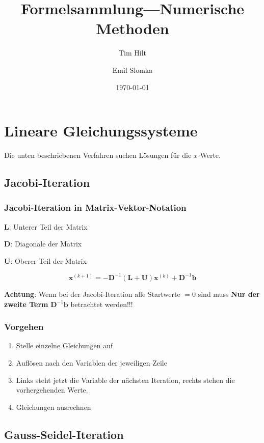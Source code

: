 \documentclass[a4paper, twoside]{article}
\title{Formelsammlung---Numerische Methoden}
\author{Tim Hilt \and Emil Slomka}
\date{\today}
\begin{document}
\maketitle

\section{Lineare Gleichungssysteme}

Die unten beschriebenen Verfahren suchen Lösungen für die $x$-Werte. 

\subsection{Jacobi-Iteration}

\subsubsection{Jacobi-Iteration in Matrix-Vektor-Notation}

$\mathbf{L}$: Unterer Teil der Matrix

$\mathbf{D}$: Diagonale der Matrix

$\mathbf{U}$: Oberer Teil der Matrix

\[\mathbf{x}^{(k+1)} = -\mathbf{D}^{-1} (\mathbf{L} + \mathbf{U})\mathbf{x}^{(k)} + \mathbf{D}^{-1}\mathbf{b}\]

\textbf{Achtung}: Wenn bei der Jacobi-Iteration alle Startwerte $=0$ sind muss \textbf{Nur der zweite Term} $\mathbf{D}^{-1}\mathbf{b}$ betrachtet werden!!!

\subsubsection{Vorgehen}

\begin{enumerate}
\item Stelle einzelne Gleichungen auf
\item Auflösen nach den Variablen der jeweiligen Zeile
\item Links steht jetzt die Variable der nächsten Iteration, rechts stehen die vorhergehenden Werte.
\item Gleichungen ausrechnen
\end{enumerate}

\subsection{Gauss-Seidel-Iteration}
\end{document}
